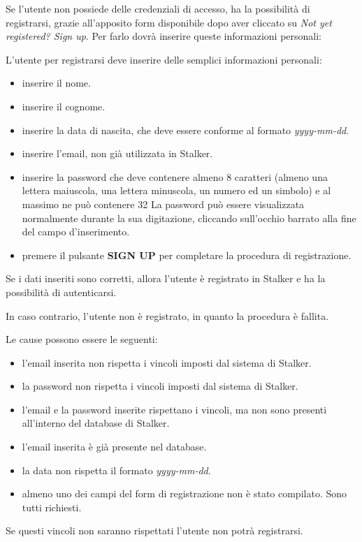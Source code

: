 \documentclass[../manuale-utente.tex]{subfiles}
\begin{document}
Se l'utente non possiede delle credenziali di accesso, ha la possibilità di registrarsi, grazie all'apposito form disponibile dopo aver cliccato su \textit{Not yet registered? Sign up}. Per farlo dovrà inserire queste informazioni personali:

L'utente per registrarsi deve inserire delle semplici informazioni personali:
\begin{itemize}
    \item inserire il nome.
    \item inserire il cognome.
    \item inserire la data di nascita, che deve essere conforme al formato \textit{yyyy-mm-dd}.
    \item inserire l'email, non già utilizzata in Stalker.
    \item inserire la password che deve contenere almeno 8 caratteri (almeno una lettera maiuscola, una lettera minuscola, un numero ed un simbolo) e al massimo ne può contenere 32 La password può essere visualizzata normalmente durante la sua digitazione, cliccando sull'occhio barrato alla fine del campo d'inserimento.
    \item premere il pulsante \textbf{SIGN UP} per completare la procedura di registrazione.
\end{itemize}

Se i dati inseriti sono corretti, allora l'utente è registrato in Stalker e ha la possibilità di autenticarsi.

In caso contrario, l'utente non è registrato, in quanto la procedura è fallita.

Le cause possono essere le seguenti:
\begin{itemize}
    \item l'email inserita non rispetta i vincoli imposti dal sistema di Stalker.
    \item la password non rispetta i vincoli imposti dal sistema di Stalker.
    \item l'email e la password inserite rispettano i vincoli, ma non sono presenti all'interno del database di Stalker.
    \item l'email inserita è già presente nel database.
    \item la data non rispetta il formato \textit{yyyy-mm-dd}.
    \item almeno uno dei campi del form di registrazione non è stato compilato. Sono tutti richiesti.
\end{itemize}

Se questi vincoli non saranno rispettati l'utente non potrà registrarsi.
\end{document}
